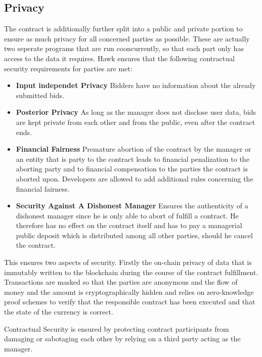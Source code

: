 \subsection{Privacy}
The contract is additionally further split into a public and private portion to ensure as much privacy for all concerned parties as possible. These are actually two seperate programs that are run cooncurrently, so that each part only has access to the data it requires.
Hawk ensures that the following contractual security requirements for parties are met:
\begin{itemize}
\item \textbf{Input independet Privacy}
Bidders have no information about the already submitted bids.
\item \textbf{Posterior Privacy}
As long as the manager does not disclose user data, bids are kept private from each other and from the public, even after the contract ends.
\item \textbf{Financial Fairness}
Premature abortion of the contract by the manager or an entity that is party to the contract leads to financial penalization to the aborting party and to financial compensation to the parties the contract is aborted upon. Developers are allowed to add additional rules concerning the financial fairness.
\item \textbf{Security Against A Dishonest Manager}
Ensures the authenticity of a dishonest manager since he is only able to abort of fulfill a contract. He therefore has no effect on the contract itself and has to pay a managerial public deposit which is distributed among all other parties, should he cancel the contract.
\end{itemize}

This ensures two aspects of security. Firstly the on-chain privacy of data that is immutably written to the blockchain during the course of the contract fulfillment. Transactions are masked so that the parties are anonymous and the flow of money and the amount is cryptographically hidden and relies on zero-knowledge proof schemes to verify that the responsible contract has been executed and that the state of the currency is correct.

Contractual Security is ensured by protecting contract participants from damaging or sabotaging each other by relying on a third party acting as the manager.

